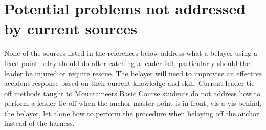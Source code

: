 \documentclass[nonacm,acmtog]{acmart}
\begin{document}
\section{Potential problems not addressed by current sources}
None of the sources listed in the references below address what a belayer using
a fixed point belay should do after catching a leader fall, particularly should
the leader be injured or require rescue. The belayer will need to improvise an
effective accident response based on their current knowledge and skill. Current
leader tie-off methods taught to Mountaineers Basic Course students do not
address how to perform a leader tie-off when the anchor master point is in
front, vis a vis behind, the belayer, let alone how to perform the procedure
when belaying off the anchor instead of the harness.
\end{document}

